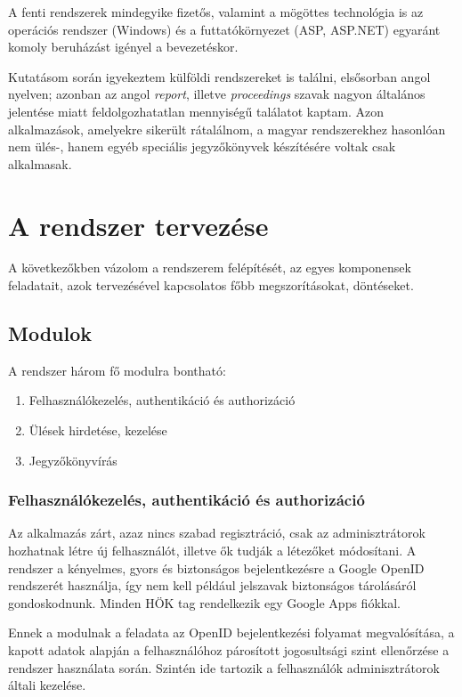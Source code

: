 \documentclass[a4paper,12pt,oneside]{report}
\begin{document}
A fenti rendszerek mindegyike fizetős, valamint a mögöttes technológia is \textendash{} az operációs rendszer (Windows) és a futtatókörnyezet (ASP, ASP.NET) egyaránt komoly beruházást igényel a bevezetéskor.

Kutatásom során igyekeztem külföldi rendszereket is találni, elsősorban angol nyelven; azonban az angol {\it report}, illetve {\it proceedings} szavak nagyon általános jelentése miatt feldolgozhatatlan mennyiségű találatot kaptam. Azon alkalmazások, amelyekre sikerült rátalálnom, a magyar rendszerekhez hasonlóan nem ülés-, hanem egyéb speciális jegyzőkönyvek készítésére voltak csak alkalmasak.

\section{A rendszer tervezése}

A következőkben vázolom a rendszerem felépítését, az egyes komponensek feladatait, azok tervezésével kapcsolatos főbb megszorításokat, döntéseket.

\subsection{Modulok}

A rendszer három fő modulra bontható:

\begin{enumerate}
    \item Felhasználókezelés, authentikáció és authorizáció
    \item Ülések hirdetése, kezelése
    \item Jegyzőkönyvírás
\end{enumerate}

\subsubsection{Felhasználókezelés, authentikáció és authorizáció}

Az alkalmazás zárt, azaz nincs szabad regisztráció, csak az adminisztrátorok hozhatnak létre új felhasználót, illetve ők tudják a létezőket módosítani. A rendszer a kényelmes, gyors és biztonságos bejelentkezésre a Google OpenID rendszerét használja, így nem kell például jelszavak biztonságos tárolásáról gondoskodnunk. Minden HÖK tag rendelkezik egy Google Apps fiókkal.

Ennek a modulnak a feladata az OpenID bejelentkezési folyamat megvalósítása, a kapott adatok alapján a felhasználóhoz párosított jogosultsági szint ellenőrzése a rendszer használata során. Szintén ide tartozik a felhasználók adminisztrátorok általi kezelése.
\end{document}
